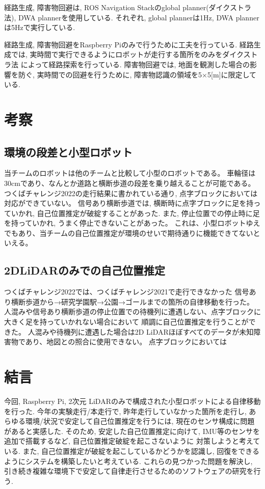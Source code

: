 \documentclass[twocolumn,9pt]{jsproceedings}
\begin{document}
経路生成, 障害物回避は, ROS Navigation Stackのglobal planner(ダイクストラ法), DWA plannerを使用している. 
それぞれ, global plannerは1Hz, DWA plannerは5Hzで実行している. 

経路生成, 障害物回避をRaspberry Piのみで行うために工夫を行っている. 
経路生成では, 実時間で実行できるようにロボットが走行する箇所をのみをダイクストラ法
によって経路探索を行っている. 障害物回避では, 地面を観測した場合の影響を防ぐ, 実時間での回避を行うために, 
障害物認識の領域を5×5[m]に限定している. 

\section{考察}

\subsection{環境の段差と小型ロボット}

当チームのロボットは他のチームと比較して小型のロボットである。
車輪径は30cmであり、なんとか道路と横断歩道の段差を乗り越えることが可能である。
つくばチャレンジ2022の走行結果に書かれている通り, 点字ブロックにおいては対応ができていない。
信号あり横断歩道では, 横断時に点字ブロックに足を持っていかれ, 自己位置推定が破綻することがあった.
また, 停止位置での停止時に足を持っていかれ, うまく停止できないことがあった。
これは、小型ロボットゆえでもあり、当チームの自己位置推定が環境のせいで期待通りに機能できてないといえる。

\subsection{2DLiDARのみでの自己位置推定}

つくばチャレンジ2022では、つくばチャレンジ2021で走行できなかった
信号あり横断歩道から→研究学園駅→公園→ゴールまでの箇所の自律移動を行った。
人混みや信号あり横断歩道の停止位置での待機列に遭遇しない、点字ブロックに大きく足を持っていかれない場合において
順調に自己位置推定を行うことができた。
人混みや待機列に遭遇した場合は2D LiDARほぼすべてのデータが未知障害物であり、地図との照合に使用できない。
点字ブロックにおいては

\section{結言}

今回, Raspberry Pi, 2次元 LiDARのみで構成された小型ロボットによる自律移動を行った. 
今年の実験走行/本走行で, 昨年走行していなかった箇所を走行し, 
あらゆる環境/状況で安定して自己位置推定を行うには, 
現在のセンサ構成に問題があると実感した. 
そのため, 安定した自己位置推定に向けて, IMU等のセンサを追加で搭載するなど, 自己位置推定破綻を起こさないように
対策しようと考えている. また, 自己位置推定が破綻を起こしているかどうかを認識し, 
回復をできるようにシステムを構築したいと考えている. 
これらの見つかった問題を解決し, 引き続き複雑な環境下で安定して自律走行させるためのソフトウェアの研究を行う. 
\end{document}
